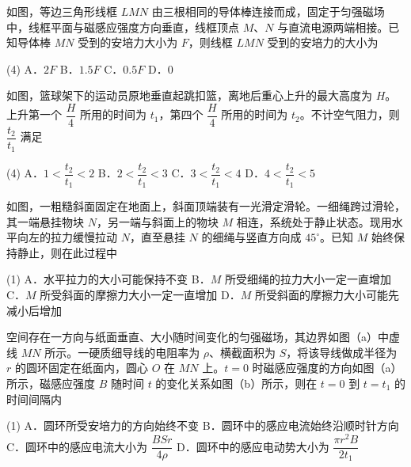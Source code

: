\begin{question}
如图，等边三角形线框 $LMN$ 由三根相同的导体棒连接而成，固定于匀强磁场中，线框平面与磁感应强度方向垂直，线框顶点 $M$、$N$ 与直流电源两端相接。已知导体棒 $MN$ 受到的安培力大小为 $F$，则线框 $LMN$ 受到的安培力的大小为\gkblank


\begin{gkopts}(4)
  \task A．$2F$
  \task B．$1.5F$
  \task C．$0.5F$
  \task D．$0$
\end{gkopts}
\end{question}

\begin{question}
如图，篮球架下的运动员原地垂直起跳扣篮，离地后重心上升的最大高度为 $H$。上升第一个 $\dfrac{H}{4}$ 所用的时间为 $t_{1}$，第四个 $\dfrac{H}{4}$ 所用的时间为 $t_{2}$。不计空气阻力，则 $\dfrac{t_{2}}{t_{1}}$ 满足\gkblank


\begin{gkopts}(4)
  \task A．$1<\dfrac{t_{2}}{t_{1}}<2$
  \task B．$2<\dfrac{t_{2}}{t_{1}}<3$
  \task C．$3<\dfrac{t_{2}}{t_{1}}<4$
  \task D．$4<\dfrac{t_{2}}{t_{1}}<5$
\end{gkopts}
\end{question}

\begin{question}
如图，一粗糙斜面固定在地面上，斜面顶端装有一光滑定滑轮。一细绳跨过滑轮，其一端悬挂物块 $N$，另一端与斜面上的物块 $M$ 相连，系统处于静止状态。现用水平向左的拉力缓慢拉动 $N$，直至悬挂 $N$ 的细绳与竖直方向成 $45^{\circ}$。已知 $M$ 始终保持静止，则在此过程中\gkblank


\begin{gkopts}(1)
  \task A．水平拉力的大小可能保持不变
  \task B．$M$ 所受细绳的拉力大小一定一直增加
  \task C．$M$ 所受斜面的摩擦力大小一定一直增加
  \task D．$M$ 所受斜面的摩擦力大小可能先减小后增加
\end{gkopts}
\end{question}

\begin{question}
空间存在一方向与纸面垂直、大小随时间变化的匀强磁场，其边界如图（a）中虚线 $MN$ 所示。一硬质细导线的电阻率为 $\rho$、横截面积为 $S$，将该导线做成半径为 $r$ 的圆环固定在纸面内，圆心 $O$ 在 $MN$ 上。$t=0$ 时磁感应强度的方向如图（a）所示，磁感应强度 $B$ 随时间 $t$ 的变化关系如图（b）所示，则在 $t=0$ 到 $t=t_{1}$ 的时间间隔内\gkblank


\begin{gkopts}(1)
  \task A．圆环所受安培力的方向始终不变
  \task B．圆环中的感应电流始终沿顺时针方向
  \task C．圆环中的感应电流大小为 $\dfrac{BSr}{4\rho}$
  \task D．圆环中的感应电动势大小为 $\dfrac{\pi r^{2}B}{2t_{1}}$
\end{gkopts}
\end{question}

